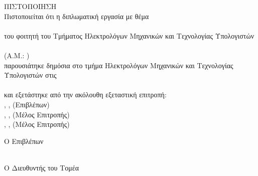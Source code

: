\pagestyle{empty}
\begin{center}
{\LARGE ΠΙΣΤΟΠΟΙΗΣΗ\\[1cm]}
\large Πιστοποιείται ότι η διπλωματική εργασία με θέμα\\[1cm]
\textbf{\bf \large \doctitle }\\[1cm]
του φοιτητή του Τμήματος Ηλεκτρολόγων Μηχανικών και Τεχνολογίας Υπολογιστών\\[1cm]
\textbf{\metonoi}\\[0.5cm]
(Α.Μ.: \studnum)\\[1cm]
παρουσιάτηκε δημόσια στο τμήμα  Ηλεκτρολόγων Μηχανικών και Τεχνολογίας Υπολογιστών στις\\[1cm]
\Large{\imerominiaExetasis}\\[1cm]
\large και εξετάστηκε από την ακόλουθη εξεταστική επιτροπή:\\[1cm]
\supname, \suptitle, \depECE\space (Επιβλέπων)\\[0.2cm]
\epitropiEna, \epitropiEnaTitle, \depECE\space (Μέλος Επιτροπής)\\[0.2cm]
\epitropiDyo, \epitropiDyoTitle, \depECE\space (Μέλος Επιτροπής)\\[1cm]
\end{center}
\begin{minipage}{0.5\textwidth}
\begin{flushleft} \large
Ο Επιβλέπων\\[0.5cm]
\supname\\
\emph{\suptitle}
\end{flushleft}
\end{minipage}
\begin{minipage}{0.5\textwidth}
\begin{flushright} \large
Ο Διευθυντής του Τομέα\\[0.5cm]
\headofdivision\\
\emph{\headofdivisiontitle}
\end{flushright}
\end{minipage}